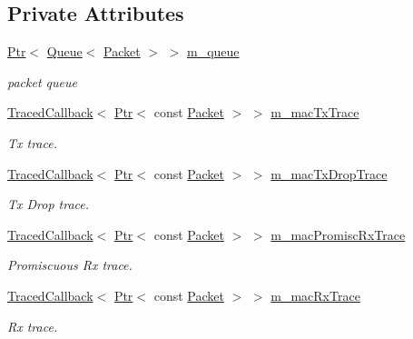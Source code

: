 \subsection*{Private Attributes}
\begin{DoxyCompactItemize}
\item 
\hyperlink{classns3_1_1Ptr}{Ptr}$<$ \hyperlink{classns3_1_1Queue}{Queue}$<$ \hyperlink{classns3_1_1Packet}{Packet} $>$ $>$ \hyperlink{classns3_1_1AlohaNoackNetDevice_a0c402bb86cd8d2475751d8198ddb3b10}{m\+\_\+queue}
\begin{DoxyCompactList}\small\item\em packet queue \end{DoxyCompactList}\item 
\hyperlink{classns3_1_1TracedCallback}{Traced\+Callback}$<$ \hyperlink{classns3_1_1Ptr}{Ptr}$<$ const \hyperlink{classns3_1_1Packet}{Packet} $>$ $>$ \hyperlink{classns3_1_1AlohaNoackNetDevice_ac8a6a956dfec61c30027e584963fa22a}{m\+\_\+mac\+Tx\+Trace}
\begin{DoxyCompactList}\small\item\em Tx trace. \end{DoxyCompactList}\item 
\hyperlink{classns3_1_1TracedCallback}{Traced\+Callback}$<$ \hyperlink{classns3_1_1Ptr}{Ptr}$<$ const \hyperlink{classns3_1_1Packet}{Packet} $>$ $>$ \hyperlink{classns3_1_1AlohaNoackNetDevice_adc3f9270d17a4e2e56cd620a6419fbfb}{m\+\_\+mac\+Tx\+Drop\+Trace}
\begin{DoxyCompactList}\small\item\em Tx Drop trace. \end{DoxyCompactList}\item 
\hyperlink{classns3_1_1TracedCallback}{Traced\+Callback}$<$ \hyperlink{classns3_1_1Ptr}{Ptr}$<$ const \hyperlink{classns3_1_1Packet}{Packet} $>$ $>$ \hyperlink{classns3_1_1AlohaNoackNetDevice_a55830dfed6857f94fbbb3ca2346c2537}{m\+\_\+mac\+Promisc\+Rx\+Trace}
\begin{DoxyCompactList}\small\item\em Promiscuous Rx trace. \end{DoxyCompactList}\item 
\hyperlink{classns3_1_1TracedCallback}{Traced\+Callback}$<$ \hyperlink{classns3_1_1Ptr}{Ptr}$<$ const \hyperlink{classns3_1_1Packet}{Packet} $>$ $>$ \hyperlink{classns3_1_1AlohaNoackNetDevice_a04f0f23d5d37f2e550c9ecdecaab29dd}{m\+\_\+mac\+Rx\+Trace}
\begin{DoxyCompactList}\small\item\em Rx trace. \end{DoxyCompactList}\item 

\end{DoxyCompactItemize}
